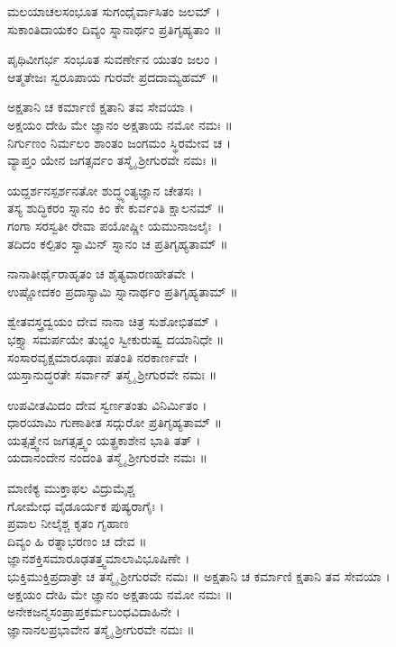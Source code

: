 ಮಲಯಾಚಲಸಂಭೂತ ಸುಗಂಧೈರ್ವಾಸಿತಂ ಜಲಮ್ ।\\
ಸುಕಾಂತಿದಾಯಕಂ ದಿವ್ಯಂ ಸ್ನಾನಾರ್ಥಂ ಪ್ರತಿಗೃಹ್ಯತಾಂ ॥\\

ಪೃಥಿವೀಗರ್ಭ ಸಂಭೂತ ಸುವರ್ಣೇನ ಯುತಂ ಜಲಂ ।\\
ಆತ್ಮತೇಜಃ ಸ್ವರೂಪಾಯ ಗುರವೇ ಪ್ರದದಾಮ್ಯಹಮ್ ॥\\

ಅಕ್ಷತಾನಿ ಚ ಕರ್ಮಾಣಿ ಕ್ಷತಾನಿ ತವ ಸೇವಯಾ ।\\
ಅಕ್ಷಯಂ ದೇಹಿ ಮೇ ಜ್ಞಾನಂ ಅಕ್ಷತಾಯ ನಮೋ ನಮಃ ॥\\
ನಿರ್ಗುಣಂ ನಿರ್ಮಲಂ ಶಾಂತಂ ಜಂಗಮಂ ಸ್ಥಿರಮೇವ ಚ ।\\
ವ್ಯಾಪ್ತಂ ಯೇನ ಜಗತ್ಸರ್ವಂ ತಸ್ಮೈ ಶ್ರೀಗುರವೇ ನಮಃ ॥\\

ಯದ್ದರ್ಶನಸ್ಪರ್ಶನತೋ ಶುದ್ಧ್ಯಂತ್ಯಜ್ಞಾನ ಚೇತಸಃ ।\\
ತಸ್ಯ ಶುದ್ಧಿಕರಂ ಸ್ನಾನಂ ಕಿಂ ಕೇ ಕುರ್ವಂತಿ ಕ್ಷಾಲನಮ್ ॥\\
ಗಂಗಾ ಸರಸ್ವತೀ ರೇವಾ ಪಯೋಷ್ಣೀ ಯಮುನಾಜಲೈಃ~।\\
ತದಿದಂ ಕಲ್ಪಿತಂ ಸ್ವಾಮಿನ್ ಸ್ನಾನಂ ಚ ಪ್ರತಿಗೃಹ್ಯತಾಮ್ ॥\\

ನಾನಾತೀರ್ಥೈರಾಹೃತಂ ಚ ಶೈತ್ಯವಾರಣಹೇತವೇ ।\\
ಉಷ್ಣೋದಕಂ ಪ್ರದಾಸ್ಯಾಮಿ ಸ್ನಾನಾರ್ಥಂ ಪ್ರತಿಗೃಹ್ಯತಾಮ್ ॥\\

ಶ್ವೇತವಸ್ತ್ರದ್ವಯಂ ದೇವ ನಾನಾ ಚಿತ್ರ ಸುಶೋಭಿತಮ್ ।\\
ಭಕ್ತ್ಯಾ ಸಮರ್ಪಯೇ ತುಭ್ಯಂ ಸ್ವೀಕುರುಷ್ವ ದಯಾನಿಧೇ ॥\\
ಸಂಸಾರವೃಕ್ಷಮಾರೂಢಾಃ ಪತಂತಿ ನರಕಾರ್ಣವೇ ।\\
ಯಸ್ತಾನುದ್ಧರತೇ ಸರ್ವಾನ್ ತಸ್ಮೈ ಶ್ರೀಗುರವೇ ನಮಃ ॥

ಉಪವೀತಮಿದಂ ದೇವ ಸ್ವರ್ಣತಂತು ವಿನಿರ್ಮಿತಂ ।\\
ಧಾರಯಾಮಿ ಗುಣಾತೀತ ಸದ್ಗುರೋ ಪ್ರತಿಗೃಹ್ಯತಾಮ್ ॥\\
ಯತ್ಸತ್ತ್ವೇನ ಜಗತ್ಸತ್ತ್ವಂ ಯತ್ಪ್ರಕಾಶೇನ ಭಾತಿ ತತ್ ।\\
ಯದಾನಂದೇನ ನಂದಂತಿ ತಸ್ಮೈ ಶ್ರೀಗುರವೇ ನಮಃ ॥

ಮಾಣಿಕ್ಯ ಮುಕ್ತಾಫಲ ವಿದ್ರುಮೈಶ್ಚ \\
ಗೋಮೇಧ ವೈಡೂರ್ಯಕ ಪುಷ್ಯರಾಗೈಃ ।\\
ಪ್ರವಾಲ ನೀಲೈಶ್ಚ ಕೃತಂ ಗೃಹಾಣ\\
 ದಿವ್ಯಂ ಹಿ ರತ್ನಾಭರಣಂ ಚ ದೇವ ॥\\
ಜ್ಞಾನಶಕ್ತಿಸಮಾರೂಢತತ್ತ್ವಮಾಲಾವಿಭೂಷಿಣೇ ।\\
ಭುಕ್ತಿಮುಕ್ತಿಪ್ರದಾತ್ರೇ ಚ ತಸ್ಮೈ ಶ್ರೀಗುರವೇ ನಮಃ ॥
\newpage
ಅಕ್ಷತಾನಿ ಚ ಕರ್ಮಾಣಿ ಕ್ಷತಾನಿ ತವ ಸೇವಯಾ ।\\
ಅಕ್ಷಯಂ ದೇಹಿ ಮೇ ಜ್ಞಾನಂ ಅಕ್ಷತಾಯ ನಮೋ ನಮಃ ॥\\
ಅನೇಕಜನ್ಮಸಂಪ್ರಾಪ್ತಕರ್ಮಬಂಧವಿದಾಹಿನೇ ।\\
ಜ್ಞಾನಾನಲಪ್ರಭಾವೇನ ತಸ್ಮೈ ಶ್ರೀಗುರವೇ ನಮಃ ॥

